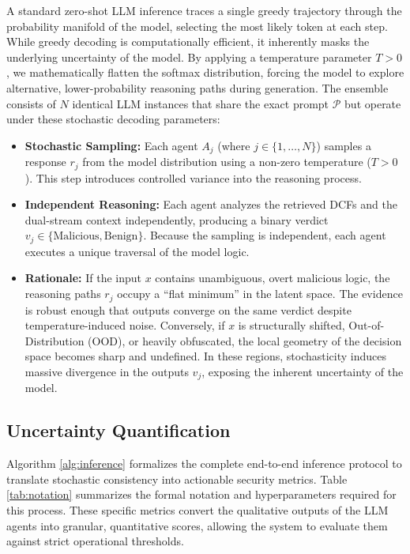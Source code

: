 \documentclass[pdflatex,sn-mathphys-num]{sn-jnl}
\begin{document}
A standard zero-shot LLM inference traces a single greedy trajectory through the probability manifold of the model, selecting the most likely token at each step. While greedy decoding is computationally efficient, it inherently masks the underlying uncertainty of the model. By applying a temperature parameter $T > 0$, we mathematically flatten the softmax distribution, forcing the model to explore alternative, lower-probability reasoning paths during generation. The ensemble consists of $N$ identical LLM instances that share the exact prompt $\mathcal{P}$ but operate under these stochastic decoding parameters:
\begin{itemize}
    \item \textbf{Stochastic Sampling:} Each agent $A_j$ (where $j \in \{1, \dots, N\}$) samples a response $r_j$ from the model distribution using a non-zero temperature ($T > 0$). This step introduces controlled variance into the reasoning process.
    \item \textbf{Independent Reasoning:} Each agent analyzes the retrieved DCFs and the dual-stream context independently, producing a binary verdict $v_j \in \{\text{Malicious}, \text{Benign}\}$. Because the sampling is independent, each agent executes a unique traversal of the model logic.
    \item \textbf{Rationale:} If the input $x$ contains unambiguous, overt malicious logic, the reasoning paths $r_j$ occupy a ``flat minimum'' in the latent space. The evidence is robust enough that outputs converge on the same verdict despite temperature-induced noise. Conversely, if $x$ is structurally shifted, Out-of-Distribution (OOD), or heavily obfuscated, the local geometry of the decision space becomes sharp and undefined. In these regions, stochasticity induces massive divergence in the outputs $v_j$, exposing the inherent uncertainty of the model.
\end{itemize}


\subsection{Uncertainty Quantification}
\label{sec:formalism}

Algorithm \ref{alg:inference} formalizes the complete end-to-end inference protocol to translate stochastic consistency into actionable security metrics. Table \ref{tab:notation} summarizes the formal notation and hyperparameters required for this process. These specific metrics convert the qualitative outputs of the LLM agents into granular, quantitative scores, allowing the system to evaluate them against strict operational thresholds.
\end{document}
